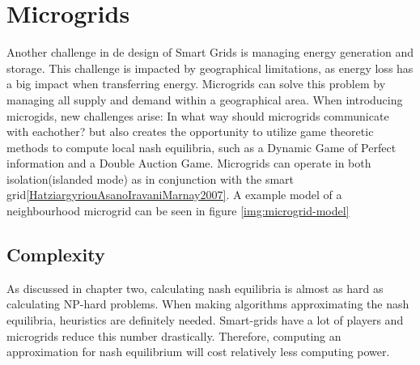 
\section{Microgrids}\label{microgrids}


Another challenge in de design of Smart Grids is managing energy generation and storage. This challenge is impacted by geographical limitations, as energy loss has a big  impact when transferring energy.\cite{EnergyLossURL}
Microgrids can solve this problem by managing all supply and demand within a geographical area. When introducing microgids, new challenges arise: In what way should microgrids communicate with eachother? but also creates the opportunity to utilize game theoretic methods to compute local nash equilibria, such as a Dynamic Game of Perfect information and a Double Auction Game.
Microgrids can operate in both isolation(islanded mode) as in conjunction with the smart grid\ref{HatziargyriouAsanoIravaniMarnay2007}. 
A example model of a neighbourhood microgrid can be seen in figure \ref{img:microgrid-model}



\subsection{Complexity}
As discussed in chapter two, calculating nash equilibria is almost as hard as calculating NP-hard problems. When making algorithms approximating the nash equilibria, heuristics are definitely needed. Smart-grids have a lot of players and microgrids reduce this number drastically. Therefore, computing an approximation for nash equilibrium will cost relatively less computing power.


